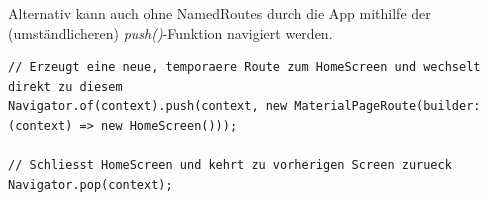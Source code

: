 Alternativ kann auch ohne NamedRoutes durch die App mithilfe der (umständlicheren) \textit{push()}-Funktion navigiert 
werden.

\begin{lstlisting}
// Erzeugt eine neue, temporaere Route zum HomeScreen und wechselt direkt zu diesem
Navigator.of(context).push(context, new MaterialPageRoute(builder: (context) => new HomeScreen()));

// Schliesst HomeScreen und kehrt zu vorherigen Screen zurueck
Navigator.pop(context);
\end{lstlisting}
